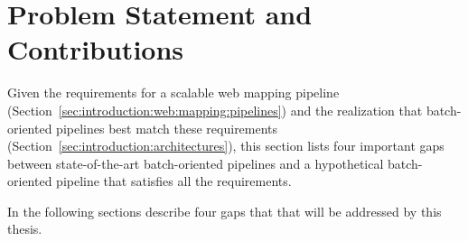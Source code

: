\documentclass[11pt, oneside]{report}
\begin{document}
{%







\section{Problem Statement and Contributions}
\label{sec:introduction:problem:statement}

Given the requirements for a scalable web mapping pipeline (Section~\ref{sec:introduction:web:mapping:pipelines}) and the realization that batch-oriented pipelines best match these requirements (Section~\ref{sec:introduction:architectures}), this section lists four important gaps between state-of-the-art batch-oriented pipelines and a hypothetical batch-oriented pipeline that satisfies all the requirements.

In the following sections describe four gaps that that will be addressed by this thesis.

}
\end{document}
